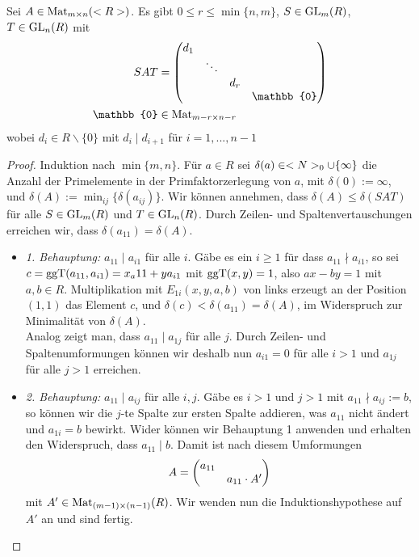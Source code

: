 \begin{theorem}
	Sei $A\in\operatorname{Mat}_{m\times n}(<R>)$. Es gibt $0\le r \le\min\{n,m\}$, $S\in\operatorname{GL}_m(R)$, $T\in\operatorname{GL}_n(R)$
	mit 
	\begin{align}
		SAT &= \begin{pmatrix}d_1 & & & \\ & \ddots & & \\ & & d_r & \\ & & & \mathbb{0}\end{pmatrix} \notag \\
		\mathbb{0} &\in\Mat_{m-r\times n-r}\notag
	\end{align}
	wobei $d_i\in R\backslash\{0\}$ mit $d_i\mid d_{i+1}$ für $i=1,...,n-1$
\end{theorem}
\begin{proof}
	Induktion nach $\min\{m,n\}$. Für $a\in R$ sei $\delta(a)\in<N>_0\cup\{\infty\}$ die Anzahl der Primelemente in der Primfaktorzerlegung von $a$, mit $\delta(0):=\infty$, und $\delta(A):=\min_{ij}\{\delta(a_{ij})\}$. Wir können annehmen, dass $\delta(A)\le \delta(SAT)$ für alle $S\in \operatorname{GL}_m(R)$ und $T\in \operatorname{GL}_n(R)$. Durch Zeilen- und Spaltenvertauschungen erreichen wir, dass $\delta(a_{11})=\delta(A)$.
	\begin{itemize}
		\item \emph{1. Behauptung:} $a_{11}\mid a_{i1}$ für alle $i$. Gäbe es ein $i\ge 1$ für dass $a_{11}\nmid a_{i1}$, so sei $c=\operatorname{ggT}(a_{11},a_{i1})=x_a{11}+ya_{i1}$ mit $\operatorname{ggT}(x,y)=1$, also $ax-by=1$ mit $a,b\in R$. Multiplikation mit $E_{1i}(x,y,a,b)$ von links erzeugt an der Position $(1,1)$ das Element $c$, und $\delta(c)<\delta(a_{11})=\delta(A)$, im Widerspruch zur Minimalität von $\delta(A)$. \\
		Analog zeigt man, dass $a_{11}\mid a_{1j}$ für alle $j$. Durch Zeilen- und Spaltenumformungen können wir deshalb nun $a_{i1}=0$ für alle $i>1$ und $a_{1j}$ für alle $j>1$ erreichen.
		\item\emph{2. Behauptung:} $a_{11}\mid a_{ij}$ für alle $i,j$. Gäbe es $i>1$ und $j>1$ mit $a_{11}\nmid a_{ij}:=b$, so können wir die $j$-te Spalte zur ersten Spalte addieren, was $a_{11}$ nicht ändert und $a_{1i}=b$ bewirkt. Wider können wir Behauptung 1 anwenden und erhalten den Widerspruch, dass $a_{11}\mid b$. Damit ist nach diesem Umformungen
		\begin{align}
			A=\begin{pmatrix}a_{11} & \\ & a_{11}\cdot A'\end{pmatrix}\notag
		\end{align}
		mit $A'\in\operatorname{Mat}_{(m-1)\times (n-1)}(R)$. Wir wenden nun die Induktionshypothese auf $A'$ an und sind fertig.
	\end{itemize}
\end{proof}

